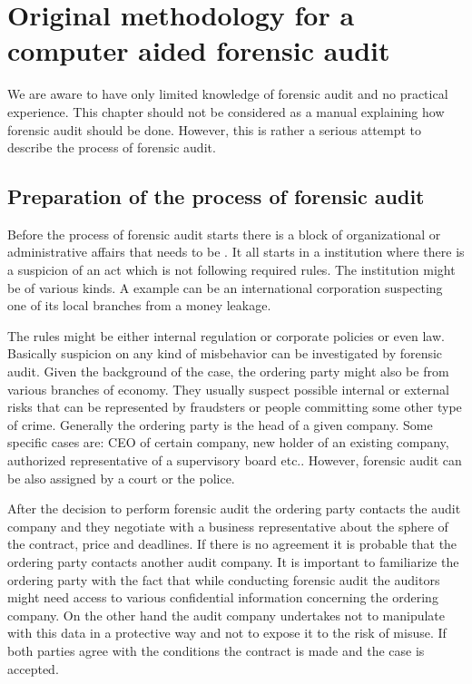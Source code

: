 \chapter{Original methodology for a computer aided forensic audit}
%
%
%


We are aware to have only limited knowledge of forensic audit and no practical experience. This chapter should not be considered as a manual explaining how forensic audit should be done.  However, this is rather a serious attempt to describe the process of forensic audit.


\section{Preparation of the process of forensic audit}
Before the process of forensic audit starts there is a block of organizational or administrative affairs that needs to be . It all starts in a institution where there is a suspicion of an act which is not following required rules. The institution might be of various kinds. A example can be an international corporation suspecting one of its local branches from a money leakage. %

The rules might be either internal regulation or corporate policies or even law. Basically suspicion on any kind of misbehavior can be investigated by forensic audit. Given the background of the case, the ordering party might also be from various branches of economy. They usually suspect possible internal or external risks that can be represented by fraudsters or people committing some other type of crime.  Generally the ordering party is the head of a given company. Some specific cases are: CEO of certain company, new holder of an existing company, authorized representative of a supervisory board etc.. However, forensic audit can be also assigned by a court or the police. 

After the decision to perform forensic audit the ordering party contacts the audit company and they negotiate with a business representative about the sphere of the contract, price and deadlines. If there is no agreement it is probable that the ordering party contacts another audit company. It is important to familiarize the ordering party with the fact that while conducting forensic audit the auditors might need access to various confidential information concerning the ordering company. On the other hand the audit company undertakes not to manipulate with this data in a protective way and not to expose it to the risk of misuse. If both parties agree with the conditions the contract is made and the case is accepted. 

